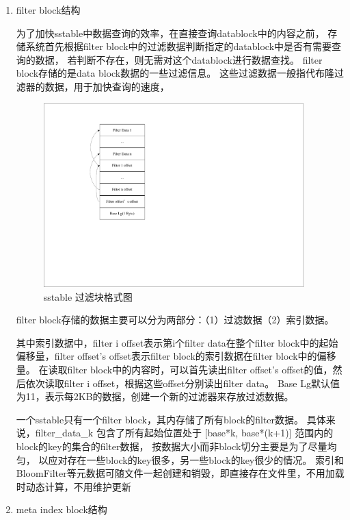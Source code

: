 \begin{enumerate}
\begin{enumerate}
	\item filter block结构
	
	为了加快sstable中数据查询的效率，在直接查询datablock中的内容之前，
	存储系统首先根据filter block中的过滤数据判断指定的datablock中是否有需要查询的数据，
	若判断不存在，则无需对这个datablock进行数据查找。
	filter block存储的是data block数据的一些过滤信息。
	这些过滤数据一般指代布隆过滤器的数据，用于加快查询的速度，
	
	\begin{figure}[H]
		\centering
		\includegraphics[width=0.95\textwidth]{pdf/filterblock_format.pdf}
		\caption{sstable 过滤块格式图}
		\label{sstable_filterblock_format}
	\end{figure}

	filter block存储的数据主要可以分为两部分：（1）过滤数据（2）索引数据。
	
	其中索引数据中，filter i offset表示第i个filter data在整个filter block中的起始偏移量，filter offset's offset表示filter block的索引数据在filter block中的偏移量。
	在读取filter block中的内容时，可以首先读出filter offset's offset的值，然后依次读取filter i offset，根据这些offset分别读出filter data。
	Base Lg默认值为11，表示每2KB的数据，创建一个新的过滤器来存放过滤数据。
	
	一个sstable只有一个filter block，其内存储了所有block的filter数据。
	具体来说，filter\_data\_k 包含了所有起始位置处于 [base*k, base*(k+1)]
	范围内的block的key的集合的filter数据，
	按数据大小而非block切分主要是为了尽量均匀，
	以应对存在一些block的key很多，另一些block的key很少的情况。
	索引和BloomFilter等元数据可随文件一起创建和销毁，即直接存在文件里，不用加载时动态计算，不用维护更新
				
	\item meta index block结构
	

\end{enumerate}
\end{enumerate}
